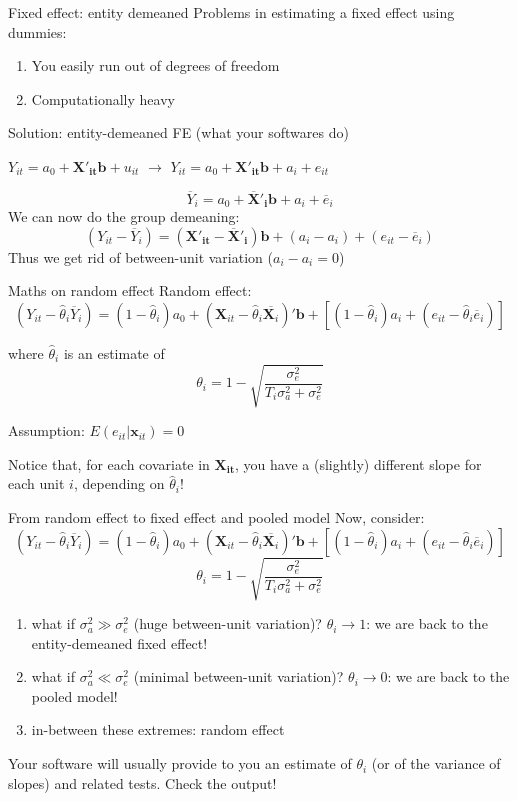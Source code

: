 \documentclass[xcolor=table,dvipsnames]{beamer}
\begin{document}
\begin{frame}{Fixed effect: entity demeaned}
Problems in estimating a fixed effect using dummies: \pause
\begin{enumerate}
\item You easily run out of degrees of freedom \pause
\item Computationally heavy
\end{enumerate} \pause

Solution: entity-demeaned FE (what your softwares do)

\begin{center}
$Y_{it} = a_0 + \mathbf{X'_{it} b} + u_{it}$ \pause $\rightarrow$ $Y_{it} = a_0 + \mathbf{X'_{it} b} + a_i + e_{it}$ 
\end{center} \pause
$$\overline{Y}_{i} = a_0 + \mathbf{\overline{X}'_{i} b} + a_i + \overline{e}_{i} $$ \pause
We can now do the group demeaning:
$$(Y_{it} - \overline{Y}_{i}) = (\mathbf{X'_{it}}-\mathbf{\overline{X}'_i}) \mathbf{b} + (a_i - a_i) + (e_{it} - \overline{e}_{i})$$ \pause
Thus we get rid of between-unit variation ($a_i - a_i=0$)
\end{frame}

\begin{frame}{Maths on random effect}
Random effect:
$$(Y_{it}-\hat{\theta}_i\overline{Y}_i) = (1-\hat{\theta}_i)a_0 + (\mathbf{X}_{it}-\hat{\theta}_i\overline{\mathbf{X}_{i}})'\mathbf{b}+[(1-\hat{\theta}_i)a_i+(e_{it}-\hat{\theta}_i\overline{e}_i)]$$ \pause

where $\hat{\theta}_i$ is an estimate of $$\theta_i = 1 - \sqrt{\frac{\sigma_e^2}{T_i\sigma^2_a+\sigma_e^2}}$$ \pause 

Assumption: $E(e_{it}|\mathbf{x}_{it})=0$ \pause

Notice that, for each covariate in $\mathbf{X_{it}}$, you have a (slightly) different slope for each unit $i$, depending on $\hat{\theta}_i$!
\end{frame}

\begin{frame}{From random effect to fixed effect and pooled model}
Now, consider:
$$(Y_{it}-\hat{\theta}_i\overline{Y}_i) = (1-\hat{\theta}_i)a_0 + (\mathbf{X}_{it}-\hat{\theta}_i\overline{\mathbf{X}_{i}})'\mathbf{b}+[(1-\hat{\theta}_i)a_i+(e_{it}-\hat{\theta}_i\overline{e}_i)]$$
$$\theta_i = 1 - \sqrt{\frac{\sigma_e^2}{T_i\sigma^2_a+\sigma_e^2}}$$ \pause

\begin{enumerate}
\item what if $\sigma^2_a\gg\sigma_e^2$ (huge between-unit variation)? \pause $\theta_i \rightarrow 1$: we are back to the entity-demeaned fixed effect! \pause
\item what if $\sigma^2_a\ll\sigma_e^2$ (minimal between-unit variation)? \pause $\theta_i \rightarrow 0$: we are back to the pooled model! \pause
\item in-between these extremes: random effect \pause
\end{enumerate}

Your software will usually provide to you an estimate of $\theta_i$ (or of the variance of slopes) and related tests. Check the output!
\end{frame}
\end{document}

